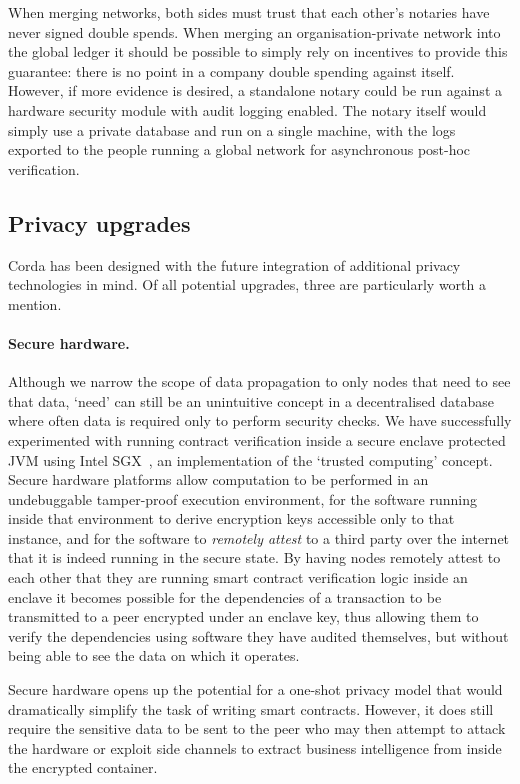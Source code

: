 \documentclass{article}
\begin{document}
When merging networks, both sides must trust that each other's notaries have never signed double spends. When
merging an organisation-private network into the global ledger it should be possible to simply rely on incentives
to provide this guarantee: there is no point in a company double spending against itself. However, if more evidence
is desired, a standalone notary could be run against a hardware security module with audit logging enabled. The
notary itself would simply use a private database and run on a single machine, with the logs exported to the people
running a global network for asynchronous post-hoc verification.

\subsection{Privacy upgrades}\label{subsec:privacy-upgrades}

Corda has been designed with the future integration of additional privacy technologies in mind. Of all potential
upgrades, three are particularly worth a mention.

\paragraph{Secure hardware.}Although we narrow the scope of data propagation to only nodes that need to see that
data, `need' can still be an unintuitive concept in a decentralised database where often data is required only to
perform security checks. We have successfully experimented with running contract verification inside a secure
enclave protected JVM using Intel SGX\texttrademark~, an implementation of the `trusted computing'
concept\cite{mitchell2005trusted}. Secure hardware platforms allow computation to be performed in an undebuggable
tamper-proof execution environment, for the software running inside that environment to derive encryption keys
accessible only to that instance, and for the software to \emph{remotely attest} to a third party over the internet
that it is indeed running in the secure state. By having nodes remotely attest to each other that they are running
smart contract verification logic inside an enclave it becomes possible for the dependencies of a transaction to be
transmitted to a peer encrypted under an enclave key, thus allowing them to verify the dependencies using software
they have audited themselves, but without being able to see the data on which it operates.

Secure hardware opens up the potential for a one-shot privacy model that would dramatically simplify the task of
writing smart contracts. However, it does still require the sensitive data to be sent to the peer who may then
attempt to attack the hardware or exploit side channels to extract business intelligence from inside the encrypted
container.
\end{document}
